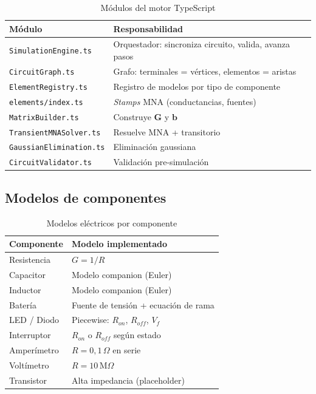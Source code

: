 \documentclass[12pt,a4paper]{article}
\begin{document}
\begin{table}[H]
  \centering
  \small
  \begin{tabularx}{\textwidth}{lX}
    \toprule
    \textbf{Módulo} & \textbf{Responsabilidad} \\
    \midrule
    \texttt{SimulationEngine.ts} & Orquestador: sincroniza circuito, valida, avanza pasos \\
    \texttt{CircuitGraph.ts} & Grafo: terminales = vértices, elementos = aristas \\
    \texttt{ElementRegistry.ts} & Registro de modelos por tipo de componente \\
    \texttt{elements/index.ts} & \textit{Stamps} MNA (conductancias, fuentes) \\
    \texttt{MatrixBuilder.ts} & Construye $\mathbf{G}$ y $\mathbf{b}$ \\
    \texttt{TransientMNASolver.ts} & Resuelve MNA + transitorio \\
    \texttt{GaussianElimination.ts} & Eliminación gaussiana \\
    \texttt{CircuitValidator.ts} & Validación pre-simulación \\
    \bottomrule
  \end{tabularx}
  \caption{Módulos del motor TypeScript}
\end{table}

\subsection{Modelos de componentes}

\begin{table}[H]
  \centering
  \begin{tabular}{ll}
    \toprule
    \textbf{Componente} & \textbf{Modelo implementado} \\
    \midrule
    Resistencia & $G = 1/R$ \\
    Capacitor & Modelo companion (Euler) \\
    Inductor & Modelo companion (Euler) \\
    Batería & Fuente de tensión + ecuación de rama \\
    LED / Diodo & Piecewise: $R_{on}$, $R_{off}$, $V_f$ \\
    Interruptor & $R_{on}$ o $R_{off}$ según estado \\
    Amperímetro & $R = 0{,}1\,\Omega$ en serie \\
    Voltímetro & $R = 10\,\text{M}\Omega$ \\
    Transistor & Alta impedancia (placeholder) \\
    \bottomrule
  \end{tabular}
  \caption{Modelos eléctricos por componente}
\end{table}
\end{document}
